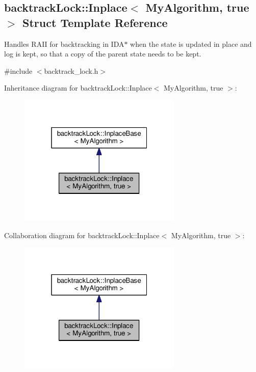 \hypertarget{structbacktrackLock_1_1Inplace_3_01MyAlgorithm_00_01true_01_4}{}\subsection{backtrack\+Lock\+:\+:Inplace$<$ My\+Algorithm, true $>$ Struct Template Reference}
\label{structbacktrackLock_1_1Inplace_3_01MyAlgorithm_00_01true_01_4}


Handles R\+A\+II for backtracking in I\+D\+A$\ast$ when the state is updated in place and log is kept, so that a copy of the parent state needs to be kept.  




{\ttfamily \#include $<$backtrack\+\_\+lock.\+h$>$}



Inheritance diagram for backtrack\+Lock\+:\+:Inplace$<$ My\+Algorithm, true $>$\+:\nopagebreak
\begin{figure}[H]
\begin{center}
\leavevmode
\includegraphics[width=220pt]{structbacktrackLock_1_1Inplace_3_01MyAlgorithm_00_01true_01_4__inherit__graph}
\end{center}
\end{figure}


Collaboration diagram for backtrack\+Lock\+:\+:Inplace$<$ My\+Algorithm, true $>$\+:\nopagebreak
\begin{figure}[H]
\begin{center}
\leavevmode
\includegraphics[width=220pt]{structbacktrackLock_1_1Inplace_3_01MyAlgorithm_00_01true_01_4__coll__graph}
\end{center}
\end{figure}
